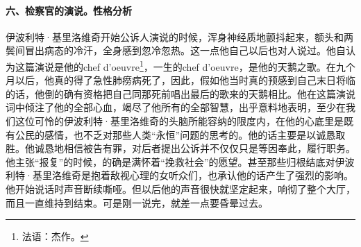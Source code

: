 \paragraph*{六、检察官的演说。性格分析}
\par 伊波利特·基里洛维奇开始公诉人演说的时候，浑身神经质地颤抖起来，额头和两鬓间冒出病态的冷汗，全身感到忽冷忽热。这一点他自己以后也对人说过。他自认为这篇演说是他的chef d’oeuvre\footnote{法语：杰作。}，一生的chef d’oeuvre，是他的天鹅之歌。在九个月以后，他真的得了急性肺痨病死了，因此，假如他当时真的预感到自己末日将临的话，他倒的确有资格把自己同那死前唱出最后的歌来的天鹅相比。他在这篇演说词中倾注了他的全部心血，竭尽了他所有的全部智慧，出乎意料地表明，至少在我们这位可怜的伊波利特·基里洛维奇的头脑所能容纳的限度内，在他的心底里是既有公民的感情，也不乏对那些人类“永恒”问题的思考的。他的话主要是以诚恳取胜。他诚恳地相信被告有罪，对后者提出公诉并不仅仅只是等因奉此，履行职务。他主张“报复”的时候，的确是满怀着“挽救社会”的愿望。甚至那些归根结底对伊波利特·基里洛维奇是抱着敌视心理的女听众们，也承认他的话产生了强烈的影响。他开始说话时声音断续嘶哑。但以后他的声音很快就坚定起来，响彻了整个大厅，而且一直维持到结束。可是刚一说完，就差一点要昏晕过去。
